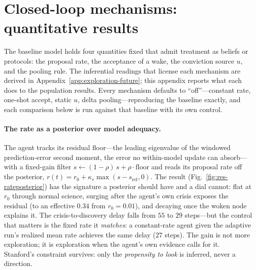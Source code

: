 \documentclass[runningheads]{llncs}
\begin{document}


\section{Closed-loop mechanisms: quantitative results}
\label{app:closing}

The baseline model holds four quantities fixed that admit treatment as beliefs or protocols: the
proposal rate, the acceptance of a wake, the conviction source $u$, and the pooling rule. The
inferential readings that license each mechanism are derived in
Appendix~\ref{app:exploration-future}; this appendix reports what each does to the population
results. Every mechanism defaults to ``off''---constant rate, one-shot accept, static $u$, delta
pooling---reproducing the baseline exactly, and each comparison below is run against that
baseline with its own control.

\paragraph{The rate as a posterior over model adequacy.}
The agent tracks its residual floor---the leading eigenvalue of the windowed prediction-error
second moment, the error no within-model update can absorb---with a fixed-gain filter
$s \leftarrow (1-\rho)\,s + \rho\cdot\mathrm{floor}$ and reads its proposal rate off the
posterior, $r(t) = r_0 + \kappa_r \max(s - s_{\mathrm{ref}}, 0)$. The result
(Fig.~\ref{fig:res-rateposterior}) has the signature a posterior should have and a dial cannot:
flat at $r_0$ through normal science, surging after the agent's own crisis exposes the residual
(to an effective $0.34$ from $r_0=0.01$), and decaying once the woken node explains it. The
crisis-to-discovery delay falls from $55$ to $29$ steps---but the control that matters is the
fixed rate it \emph{matches}: a constant-rate agent given the adaptive run's realized mean rate
achieves the same delay ($27$ steps). The gain is not more exploration; it is exploration when
the agent's own evidence calls for it. Stanford's constraint survives: only the \emph{propensity
to look} is inferred, never a direction.
\end{document}
